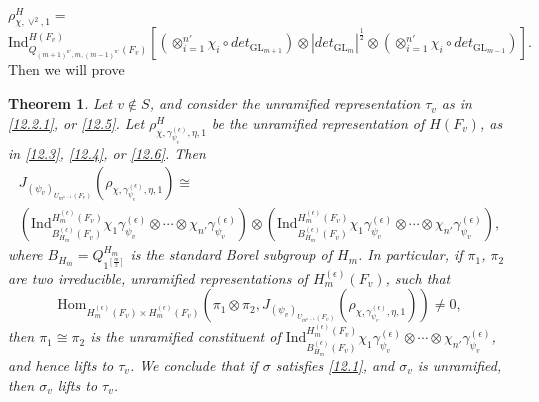 \documentclass[12pts]{amsart}
\newcommand{\GL}{{\mathrm{GL}}}
\newcommand{\Hom}{{\mathrm{Hom}}}
\newcommand{\Ind}{{\mathrm{Ind}}}
\newtheorem{thm}{Theorem}[section]
\begin{document}
\\
$\rho^H_{\chi,\vee^2,1}=$
\\
\begin{equation}\label{12.6}
\Ind^{H(F_v)}_{Q_{(m+1)^{n'},m,(m-1)^{n'}}(F_v)}[(\otimes_{i=1}^{n'}\chi_i\circ det_{\GL_{m+1}}) \otimes |det_{\GL_m}|^{\frac{1}{2}}\otimes (\otimes_{i=1}^{n'}\chi_i\circ det_{\GL_{m-1}})]. 
\end{equation}   
Then we will prove 
\begin{thm}\label{thm 12.2}
Let $v\notin S$, and consider the unramified representation $\tau_v$ as in \eqref{12.2.1}, or \eqref{12.5}. Let $\rho^H_{\chi,\gamma_{\psi_v}^{(\epsilon)},\eta,1}$ be the unramified representation of $H(F_v)$, as in \eqref{12.3}, \eqref{12.4}, or \eqref{12.6}. Then
\begin{multline}\label{12.6.1}
J_{(\psi_v)_{U_{m^{n-1}}(F_v)}}(\rho_{\chi,\gamma_{\psi_v}^{(\epsilon)},\eta,1})\cong\\ (\Ind_{B_{H_m}^{(\epsilon)}(F_v)}^{H_m^{(\epsilon)}(F_v)}\chi_1\gamma_{\psi_v}^{(\epsilon)}\otimes\cdots\otimes\chi_{n'}\gamma_{\psi_v}^{(\epsilon)})\otimes (\Ind_{B_{H_m}^{(\epsilon)}(F_v)}^{H_m^{(\epsilon)}(F_v)}\chi_1\gamma_{\psi_v}^{(\epsilon)}\otimes\cdots\otimes\chi_{n'}\gamma_{\psi_v}^{(\epsilon)}),
\end{multline}
where $B_{H_m}=Q_{1^{[\frac{m}{2}]}}^{H_m}$ is the standard Borel subgroup of $H_m$. In particular, if $\pi_1$, $\pi_2$ are two irreducible, unramified representations of $H_m^{(\epsilon)}(F_v)$, such that
\begin{equation}\label{12.6.2}
\Hom_{H_m^{(\epsilon)}(F_v)\times H_m^{(\epsilon)}(F_v)}(\pi_1\otimes \pi_2,J_{(\psi_v)_{U_{m^{n-1}}(F_v)}}(\rho_{\chi,\gamma_{\psi_v}^{(\epsilon)},\eta,1}))\neq 0,
\end{equation}
then $\pi_1\cong \pi_2$ is the unramified constituent of $\Ind_{B_{H_m}^{(\epsilon)}(F_v)}^{H_m^{(\epsilon)}(F_v)}\chi_1\gamma_{\psi_v}^{(\epsilon)}\otimes\cdots\otimes\chi_{n'}\gamma_{\psi_v}^{(\epsilon)}$, and hence lifts to $\tau_v$. We conclude that if $\sigma$ satisfies \eqref{12.1}, and $\sigma_v$ is unramified, then $\sigma_v$ lifts to $\tau_v$.
\end{thm}		
\end{document}

